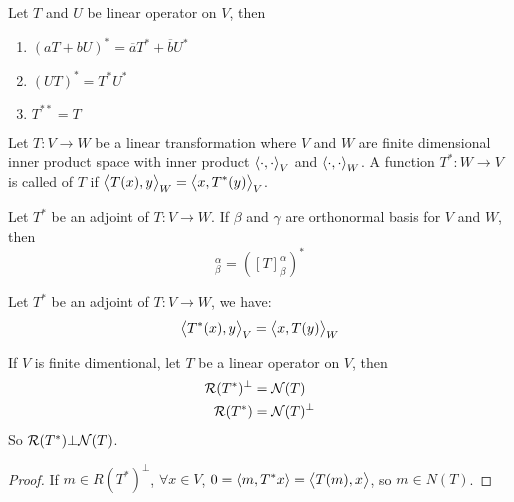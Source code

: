 \begin{theorem}
    Let $T$ and $U$ be linear operator on $V$, then
    \begin{enumerate}
        \item $(aT+bU)^* = \overline{a}T^* + \overline{b}U^*$
        \item $(UT)^* = T^* U^*$
        \item $T^{**} = T$
    \end{enumerate}    
\end{theorem}


\begin{definition}
    Let $T : V \rightarrow W$ be a linear transformation where $V$ and $W$ are finite dimensional inner product space with inner product $\left\langle \displaystyle \cdot{}, \cdot{} \right\rangle_V$ and $\left\langle \displaystyle \cdot{}, \cdot{} \right\rangle_W$. A function $T^* : W \rightarrow V$ is called  of $T$ if $\left\langle \displaystyle T(x), y \right\rangle_W = \left\langle \displaystyle x, T^*(y) \right\rangle_V$.
\end{definition}

\begin{theorem}
    Let $T^*$ be an adjoint of $T: V \rightarrow W$. If $\beta$ and $\gamma$ are orthonormal basis for $V$ and $W$, then
    \begin{equation}
        [T^*]_\beta^\alpha = ([T]_\beta^\alpha)^*
    \end{equation}
\end{theorem}

\begin{theorem}
    Let $T^*$ be an adjoint of $T: V \rightarrow W$, we have:
    \begin{equation}
        \left\langle \displaystyle T^*(x), y \right\rangle_V = \left\langle \displaystyle x, T(y) \right\rangle_W
    \end{equation}
\end{theorem}



\begin{theorem}\label{nullandreciprocaladjoint}
    If $V$ is finite dimentional, let $T$ be a linear operator on $V$, then
    \begin{equation*}
        \begin{aligned}
            \mathcal{R}(T^*)^\bot &= \mathcal{N}(T)\\
            \mathcal{R}(T^*) &= \mathcal{N}(T)^\bot
        \end{aligned}
    \end{equation*}
    So $\mathcal{R}(T^*) \bot \mathcal{N}(T)$.
\end{theorem}
\begin{proof}
    If $m \in R(T^*)^\bot$, $\forall x \in V$, $0 = \left\langle \displaystyle m, T^*x \right\rangle = \left\langle \displaystyle T(m), x \right\rangle$, so $m \in N(T)$.
\end{proof}



